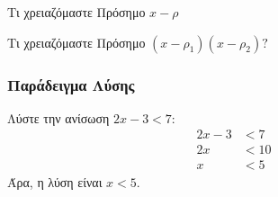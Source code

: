 \documentclass{../../presentation}
\begin{document}
\begin{frame}{Τι χρειαζόμαστε}
  Πρόσημο $x-ρ$
  \begin{center}
  \end{center}

\end{frame}



\begin{frame}{Τι χρειαζόμαστε}
  Πρόσημο $(x-ρ_1)(x-ρ_2)?$
  \begin{center}
  \end{center}

\end{frame}

\begin{frame}
  \frametitle{Παράδειγμα Λύσης}
  Λύστε την ανίσωση $2x - 3 < 7$:
  \begin{align*}
    2x - 3 & < 7  \\
    2x     & < 10 \\
    x      & < 5
  \end{align*}
  Άρα, η λύση είναι $x < 5$.
\end{frame}
\end{document}
